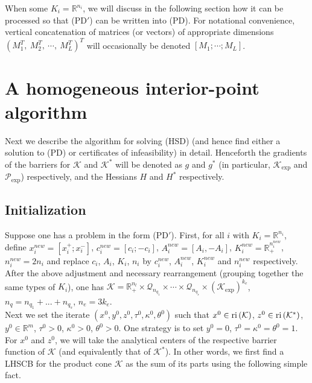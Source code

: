 \documentclass[10pt]{article}
\theoremstyle{definition}
\theoremstyle{plain}
\def\interior{\protect{\textnormal{ri}}}
\begin{document}
When some $K_i = \mathbb{R}^{n_i}$, we will discuss in the following section how it can be processed so that (PD$'$) can be written into (PD). For notational convenience, vertical concatenation of matrices (or vectors) of appropriate dimensions $(M_1^T,\ M_2^T,\ \cdots,\ M_L^T)^T$ will occasionally be denoted $[M_1; \cdots ; M_L]$.

\section{A homogeneous interior-point algorithm}
Next we describe the algorithm for solving (HSD) (and hence find either a solution to (PD) or certificates of infeasibility) in detail. Henceforth the gradients of the barriers for $\mathcal{K}$ and $\mathcal{K}^*$ will be denoted as $g$ and $g^*$ (in particular, $\mathcal{K}_{\exp}$ and $\mathcal{P}_{\exp}$) respectively, and the Hessians $H$ and $H^*$ respectively.
\subsection{Initialization}

Suppose one has a problem in the form (PD$'$). First, for all $i$ with $K_i = \mathbb{R}^{n_i}$, define $x_i^{new} = [x_i^+; x_i^-]$, $c_i^{new} = [c_i; -c_i]$, $A_i^{new} = [A_i, -A_i]$, $K_i^{new} = \mathbb{R}_+^{n_i^{new}}$, $n_i^{new} = 2n_i$ and replace $c_i$, $A_i$, $K_i$, $n_i$ by $c_i^{new}$, $A_i^{new}$, $K_i^{new}$ and $n_i^{new}$ respectively. After the above adjustment and necessary rearrangement (grouping together the same types of $K_i$), one has $\mathcal{K} = \mathbb{R}_+^{n_l} \times \mathcal{Q}_{n_{q_1}} \times \cdots \times \mathcal{Q}_{n_{q_s}} \times \left(\mathcal{K}_{\exp}\right)^{k_e}$, $n_q = n_{q_1} + ... + n_{q_s}$, $n_e = 3k_e$. \\

Next we set the iterate $(x^0,y^0, z^0, \tau^0, \kappa^0, \theta^0)$ such that $x^0 \in \interior\left(\mathcal{K}\right)$, $z^0 \in \interior\left(\mathcal{K}^*\right)$, $y^0 \in \mathbb{R}^m$, $\tau^0 > 0$, $\kappa^0 > 0$, $\theta^0>0$. One strategy is to set $y^0 = 0$, $\tau^0 = \kappa^0 = \theta^0 = 1$. For $x^0$ and $z^0$, we will take the analytical centers of the respective barrier function of $\mathcal{K}$ (and equivalently that of $\mathcal{K}^*$). In other words, we first find a LHSCB for the product cone $\mathcal{K}$ as the sum of its parts using the following simple fact.
\end{document}
